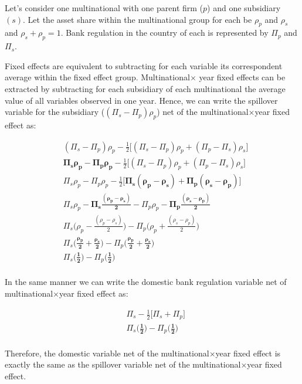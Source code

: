 \documentclass[12pt]{article}
\begin{document}
	
	
	Let's consider one multinational with one parent firm ($p$) and one subsidiary $(s)$. Let the asset share within the multinational group for each be $\rho_p$ and $\rho_s$ and $\rho_s+\rho_p=1$. Bank regulation in the country of each is represented by $\Pi_p$ and $\Pi_s$.
	
	Fixed effects are equivalent to subtracting for each variable its correspondent average within the fixed effect group. Multinational$\times$ year fixed effects can be extracted by subtracting for each subsidiary of each multinational the average value of all variables observed in one year. Hence, we can write the spillover variable for the subsidiary ($(\Pi_{s}-\Pi_{p})\rho_p$) net of the multinational$\times$year fixed effect as:
 
 
 
	\begin{equation}
	\begin{aligned}
	&(\Pi_{s}-\Pi_{p})\rho_p-\frac{1}{2}\bigg[(\Pi_{s}-\Pi_{p})\rho_p+(\Pi_{p}-\Pi_{s})\rho_s\bigg]\\
	&\bm{\Pi_{s}\rho_p-\Pi_{p}\rho_p}-\frac{1}{2}\bigg[(\Pi_{s}-\Pi_{p})\rho_p+(\Pi_{p}-\Pi_{s})\rho_s\bigg]\\
	&\Pi_{s}\rho_p-\Pi_{p}\rho_p-\frac{1}{2}\bigg[\bm{\Pi_{s}(\rho_p-\rho_s)+\Pi_{p}(\rho_s-\rho_p)}\bigg]\\
	&\Pi_{s}\rho_p-\bm{\Pi_s\frac{(\rho_p-\rho_s)}{2}}-\Pi_{p}\rho_p-\bm{\Pi_p\frac{(\rho_s-\rho_p)}{2}}\\
	&\Pi_{s}\bigg(\rho_p-\frac{(\rho_p-\rho_s)}{2}\bigg)-\Pi_{p}\bigg(\rho_p+\frac{(\rho_s-\rho_p)}{2}\bigg)\\
	&\Pi_{s}\bigg(\bm{\frac{\rho_p}{2}+\frac{\rho_s}{2}}\bigg)-\Pi_{p}\bigg(\bm{\frac{\rho_p}{2}+\frac{\rho_s}{2}}\bigg)\\
	&\Pi_{s}\bigg(\bm{\frac{1}{2}}\bigg)-\Pi_{p}\bigg(\bm{\frac{1}{2}}\bigg)\\
	\end{aligned}
	\end{equation}

In the same manner we can write the domestic bank regulation variable net of multinational$\times$year fixed effect as: 

\begin{equation}
\begin{aligned}
&\Pi_{s}-\frac{1}{2}\bigg[\Pi_{s}+\Pi_{p}\bigg]\\
&\Pi_{s}\bigg(\bm{\frac{1}{2}}\bigg)-\Pi_{p}\bigg(\bm{\frac{1}{2}}\bigg)\\
\end{aligned}
\end{equation}
	
Therefore, the domestic variable net of the multinational$\times$year fixed effect is exactly the same as the spillover variable net of the multinational$\times$year fixed effect.	
\end{document}
